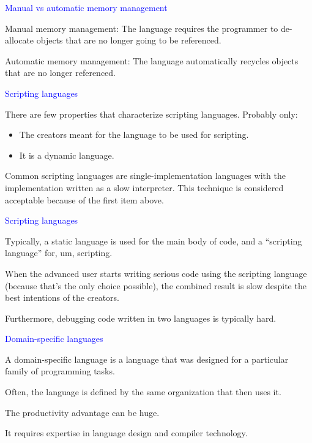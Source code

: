 \documentclass{slides}
\newcommand{\ti}[1]{\begin{center}\Large{\textcolor{blue}{#1}}\end{center}}
\begin{document}
\begin{slide}\ti{Manual vs automatic memory management}

Manual memory management: The language requires the programmer to
de-allocate objects that are no longer going to be referenced.

Automatic memory management: The language automatically recycles
objects that are no longer referenced.

\vfill\end{slide}
\begin{slide}\ti{Scripting languages}

There are few properties that characterize scripting languages.
Probably only:

\begin{itemize}
\item The creators meant for the language to be used for scripting.
\item It is a dynamic language.
\end{itemize}

Common scripting languages are single-implementation languages with
the implementation written as a slow interpreter.  This technique is
considered acceptable because of the first item above.

\vfill\end{slide}
\begin{slide}\ti{Scripting languages}

Typically, a static language is used for the main body of code, and a
``scripting language'' for, um, scripting.

When the advanced user starts writing serious code using the scripting
language (because that's the only choice possible), the combined
result is slow despite the best intentions of the creators.

Furthermore, debugging code written in two languages is typically hard.

\vfill\end{slide}
\begin{slide}\ti{Domain-specific languages}

A domain-specific language is a language that was designed for a
particular family of programming tasks.

Often, the language is defined by the same organization that then uses
it.

The productivity advantage can be huge.

It requires expertise in language design and compiler technology.

\vfill\end{slide}
\end{document}
